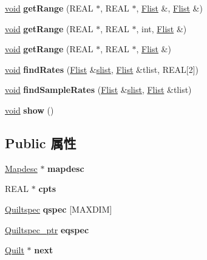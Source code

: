 \begin{DoxyCompactItemize}
\hyperlink{interfacevoid}{void} {\bfseries get\+Range} (R\+E\+AL $\ast$, R\+E\+AL $\ast$, \hyperlink{class_flist}{Flist} \&, \hyperlink{class_flist}{Flist} \&)
\item 
\mbox{\label{class_quilt_a304c388ef717737386d35a18d74191be}} 
\hyperlink{interfacevoid}{void} {\bfseries get\+Range} (R\+E\+AL $\ast$, R\+E\+AL $\ast$, int, \hyperlink{class_flist}{Flist} \&)
\item 
\mbox{\label{class_quilt_ac0d6e86f0189747f5fdd4baf61e73407}} 
\hyperlink{interfacevoid}{void} {\bfseries get\+Range} (R\+E\+AL $\ast$, R\+E\+AL $\ast$, \hyperlink{class_flist}{Flist} \&)
\item 
\mbox{\label{class_quilt_ab5747aac35f631a138f7eb99712e7797}} 
\hyperlink{interfacevoid}{void} {\bfseries find\+Rates} (\hyperlink{class_flist}{Flist} \&\hyperlink{classslist}{slist}, \hyperlink{class_flist}{Flist} \&tlist, R\+E\+AL\mbox{[}2\mbox{]})
\item 
\mbox{\label{class_quilt_adaeccb365d214759a510ad0541262694}} 
\hyperlink{interfacevoid}{void} {\bfseries find\+Sample\+Rates} (\hyperlink{class_flist}{Flist} \&\hyperlink{classslist}{slist}, \hyperlink{class_flist}{Flist} \&tlist)
\item 
\mbox{\label{class_quilt_a2ddfcfe422595d239855d356cbe68ad3}} 
\hyperlink{interfacevoid}{void} {\bfseries show} ()
\end{DoxyCompactItemize}
\subsection*{Public 属性}
\begin{DoxyCompactItemize}
\item 
\mbox{\label{class_quilt_a54118ba6a36fff9351147042e77fc8f6}} 
\hyperlink{class_mapdesc}{Mapdesc} $\ast$ {\bfseries mapdesc}
\item 
\mbox{\label{class_quilt_a2d81506fabb884789c2a5855a7a31ae8}} 
R\+E\+AL $\ast$ {\bfseries cpts}
\item 
\mbox{\label{class_quilt_acf87e288b8cb1ac3499246b2130af32b}} 
\hyperlink{struct_quiltspec}{Quiltspec} {\bfseries qspec} \mbox{[}M\+A\+X\+D\+IM\mbox{]}
\item 
\mbox{\label{class_quilt_af15b1f9fa078c736c194fa1b8fe9669a}} 
\hyperlink{struct_quiltspec}{Quiltspec\+\_\+ptr} {\bfseries eqspec}
\item 
\mbox{\label{class_quilt_a4c6db5de4668c1d6c87eb1ba9bd7af04}} 
\hyperlink{class_quilt}{Quilt} $\ast$ {\bfseries next}
\end{DoxyCompactItemize}


